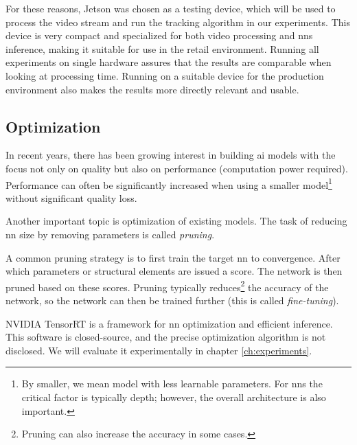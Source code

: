 For these reasons, \gls{Jetson}\cite{jetson} was chosen as a testing device, which will be used to process the video stream and run the tracking algorithm in our experiments. This device is very compact and specialized for both video processing and \glspl{nn} inference, making it suitable for use in the retail environment. Running all experiments on single hardware assures that the results are comparable when looking at processing time. Running on a suitable device for the production environment also makes the results more directly relevant and usable.

\subsection{Optimization}

In recent years, there has been growing interest in building \gls{ai} models with the focus not only on quality but also on performance (computation power required)\cite{yukai_yang_2020_4294717_fastmot,tracktor_2019_ICCV,yolo}. Performance can often be significantly increased when using a smaller model\footnote{By smaller, we mean model with less learnable parameters. For \glspl{nn} the critical factor is typically depth; however, the overall architecture is also important.} without significant quality loss\cite{yang2018ssr}.

Another important topic is optimization of existing models. The task of reducing \gls{nn} size by removing parameters is called \textit{pruning}\cite{blalock2020stateOfPruning}.

A common pruning strategy\cite{blalock2020stateOfPruning} is to first train the target \gls{nn} to convergence. After which parameters or structural elements are issued a score. The network is then pruned based on these scores. Pruning typically reduces\footnote{Pruning can also increase the accuracy in some cases\cite{Molchanov_2019_CVPR_improtanceEstimationForPruning}.} the accuracy of the network, so the network can then be trained further (this is called \textit{fine-tuning}).

NVIDIA TensorRT\cite{vanholder2016efficientTensorRT} is a framework for \gls{nn} optimization and efficient inference. This software is closed-source, and the precise optimization algorithm is not disclosed. We will evaluate it experimentally in chapter \ref{ch:experiments}.
